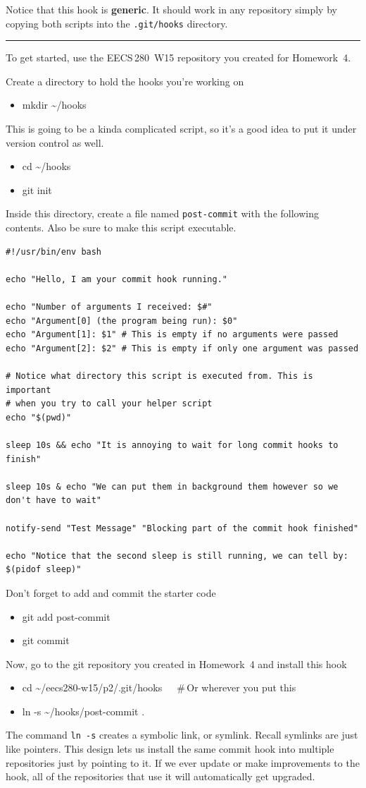 \documentclass{article}
\begin{document}
\medskip
\noindent
Notice that this hook is \textbf{generic}. It should work in any repository
simply by copying both scripts into the \texttt{.git/hooks} directory.

\bigskip
\hrule
\bigskip

\medskip
\noindent
To get started, use the EECS\,280~W15 repository you created for Homework~4.

\medskip
\noindent
Create a directory to hold the hooks you're working on
\begin{itemize}\tt
  \item mkdir \textasciitilde/hooks
\end{itemize}
This is going to be a kinda complicated script, so it's a good
idea to put it under version control as well.
\begin{itemize}\tt
  \item cd \textasciitilde/hooks
  \item git init
\end{itemize}
Inside this directory, create a file named \texttt{post-commit} with the
following contents.  Also be sure to make this script executable.
\begin{lstlisting}
#!/usr/bin/env bash

echo "Hello, I am your commit hook running."

echo "Number of arguments I received: $#"
echo "Argument[0] (the program being run): $0"
echo "Argument[1]: $1" # This is empty if no arguments were passed
echo "Argument[2]: $2" # This is empty if only one argument was passed

# Notice what directory this script is executed from. This is important
# when you try to call your helper script
echo "$(pwd)"

sleep 10s && echo "It is annoying to wait for long commit hooks to finish"

sleep 10s & echo "We can put them in background them however so we don't have to wait"

notify-send "Test Message" "Blocking part of the commit hook finished"

echo "Notice that the second sleep is still running, we can tell by: $(pidof sleep)"
\end{lstlisting}
%
Don't forget to add and commit the starter code
\begin{itemize}\tt
  \item git add post-commit
  \item git commit
\end{itemize}
%
Now, go to the git repository you created in Homework~4 and install this hook
\begin{itemize}\tt
  \item cd \textasciitilde/eecs280-w15/p2/.git/hooks~~~\#\,Or wherever you put this
  \item ln -s \textasciitilde/hooks/post-commit .
\end{itemize}
The command \texttt{ln -s} creates a symbolic link, or symlink. Recall
symlinks are just like pointers. This design lets us install the same commit
hook into multiple repositories just by pointing to it. If we ever update or
make improvements to the hook, all of the repositories that use it will
automatically get upgraded.
\end{document}
